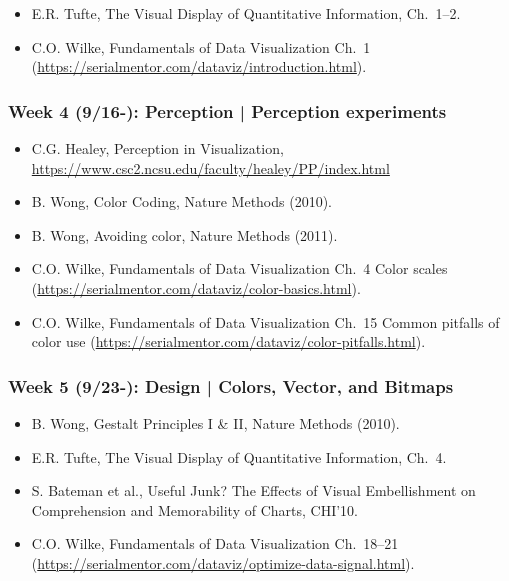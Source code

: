 \documentclass[11pt,article,oneside]{memoir} %
\begin{document}
\begin{itemize}\itemsep0em 
\item E.R. Tufte, The Visual Display of Quantitative Information, Ch.~1--2.
\item C.O. Wilke, Fundamentals of Data Visualization Ch.~1 (\url{https://serialmentor.com/dataviz/introduction.html}). 
\end{itemize}	


\subsubsection{Week 4 (9/16-): Perception | Perception experiments }%

\begin{itemize}\itemsep0em 
\item C.G. Healey, Perception in Visualization, \url{https://www.csc2.ncsu.edu/faculty/healey/PP/index.html}
\item B. Wong, Color Coding, Nature Methods (2010).
\item B. Wong, Avoiding color, Nature Methods (2011). 
\item C.O. Wilke, Fundamentals of Data Visualization Ch.~4 Color scales (\url{https://serialmentor.com/dataviz/color-basics.html}). 
\item C.O. Wilke, Fundamentals of Data Visualization Ch.~15 Common pitfalls of color use (\url{https://serialmentor.com/dataviz/color-pitfalls.html}).
\end{itemize}	
\subsubsection{Week 5 (9/23-): Design | Colors, Vector, and Bitmaps }%

\begin{itemize}\itemsep0em 
\item B. Wong, Gestalt Principles I \& II, Nature Methods (2010). 
\item E.R. Tufte, The Visual Display of Quantitative Information, Ch.~4.
\item S. Bateman et al., Useful Junk? The Effects of Visual Embellishment on Comprehension and Memorability of Charts, CHI'10.
\item C.O. Wilke, Fundamentals of Data Visualization Ch.~18--21 (\url{https://serialmentor.com/dataviz/optimize-data-signal.html}). 
\end{itemize}	
\end{document}
